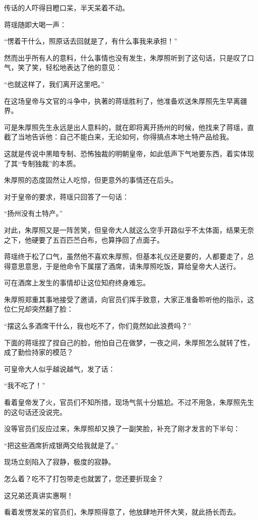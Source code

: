 \begin{multicols}{\theparacolNo}
传话的人吓得目瞪口呆，半天呆着不动。

蒋瑶随即大喝一声：

“愣着干什么，照原话去回就是了，有什么事我来承担！”

然而出乎所有人的意料，什么事情也没有发生，朱厚照听到了这句话，只是叹了口气，笑了笑，轻松地表达了他的意见：

“也就这样了，我们离开这里吧。”

在这场皇帝与文官的斗争中，执著的蒋瑶胜利了，他准备欢送朱厚照先生早离疆界。

可是朱厚照先生永远是出人意料的，就在即将离开扬州的时候，他找来了蒋瑶，直截了当地告诉他：自己不能白来，无论如何，你得搞点本地土特产品给我。

这就是传说中黑暗专制、恐怖独裁的明朝皇帝，如此低声下气地要东西，着实体现了其“专制独裁”的本质。

朱厚照的态度固然让人吃惊，但更意外的事情还在后头。

对于皇帝的要求，蒋瑶只回答了一句话：

“扬州没有土特产。”

对此，朱厚照又是一阵苦笑，但皇帝大人就这么空手开路似乎不太体面，结果无奈之下，他硬要了五百匹苎白布，也算挣回了点面子。

蒋瑶终于松了口气，虽然他不喜欢朱厚照，但基本礼仪还是要的，人都要走了，总得意思意思，于是他命令下属摆了酒席，请朱厚照吃饭，算给皇帝大人送行。

可在酒席上发生的事情却让这位知府终身难忘。

朱厚照郑重其事地接受了邀请，向官员们挥手致意，大家正准备聆听他的指示，这位仁兄却突然翻了脸：

“摆这么多酒席干什么，我也吃不了，你们竟然如此浪费吗？”

下面的蒋瑶捏了捏自己的脸，他怕自己在做梦，一夜之间，朱厚照怎么就转了性，成了勤俭持家的模范？

可皇帝大人似乎越说越气，发了话：

“我不吃了！”

看着皇帝发了火，官员们不知所措，现场气氛十分尴尬。不过不用急，朱厚照先生的这句话还没说完。

没等官员们反应过来，朱厚照却又换了一副笑脸，补充了刚才发言的下半句：

“把这些酒席折成银两交给我就是了。”

现场立刻陷入了寂静，极度的寂静。

怎么着？吃不了打包带走也就罢了，您还要折现金？

这兄弟还真讲实惠啊！

看着发愣发呆的官员们，朱厚照得意了，他放肆地开怀大笑，就此扬长而去。


\end{multicols}
